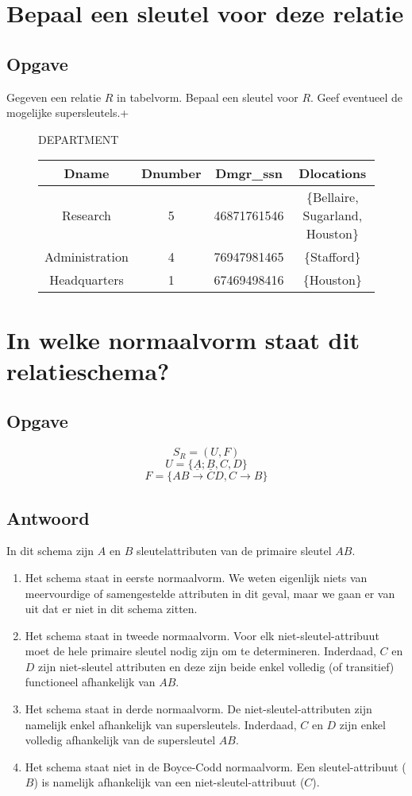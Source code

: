 \documentclass[normaalvormen.tex]{subfiles}
\begin{document}
\section{Bepaal een sleutel voor deze relatie}
\subsection*{Opgave}
Gegeven een relatie $R$ in tabelvorm. Bepaal een sleutel voor $R$.
Geef eventueel de mogelijke supersleutels.+
\begin{figure}[H]
\centering
DEPARTMENT\\
\begin{tabular}{c|c|c|c}
Dname & Dnumber & Dmgr\_ssn & Dlocations\\\hline
Research &5 & 46871761546 & \{Bellaire, Sugarland, Houston\}\\
Administration & 4& 76947981465 & \{Stafford\}\\
Headquarters & 1 & 67469498416 & \{Houston\}
\end{tabular}
\end{figure}

\section{In welke normaalvorm staat dit relatieschema?}
\subsection*{Opgave}
\[
S_{R} = (U,F)
\]
\[
U = \{\underline{A};\underline{B},C,D\}
\]
\[
F = \{AB\rightarrow CD, C \rightarrow B\}
\]

\subsection*{Antwoord}
In dit schema zijn $A$ en $B$ sleutelattributen van de primaire sleutel $AB$.
\begin{enumerate}
\item Het schema staat in eerste normaalvorm. We weten eigenlijk niets van meervourdige of samengestelde attributen in dit geval, maar we gaan er van uit dat er niet in dit schema zitten.

\item Het schema staat in tweede normaalvorm. Voor elk niet-sleutel-attribuut moet de hele primaire sleutel nodig zijn om te determineren. Inderdaad, $C$ en $D$ zijn niet-sleutel attributen en deze zijn beide enkel volledig (of transitief) functioneel afhankelijk van $AB$.

\item Het schema staat in derde normaalvorm. De niet-sleutel-attributen zijn namelijk enkel afhankelijk van supersleutels. Inderdaad, $C$ en $D$ zijn enkel volledig afhankelijk van de supersleutel $AB$.

\item Het schema staat niet in de Boyce-Codd normaalvorm. Een sleutel-attribuut ($B$) is namelijk afhankelijk van een niet-sleutel-attribuut ($C$).
\end{enumerate}
\end{document}
